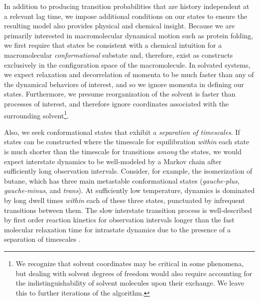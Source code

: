 In addition to producing transition probabilities that are history independent at a relevant lag time, we impose additional conditions on our states to ensure the resulting model also provides physical and chemical insight.
Because we are primarily interested in macromolecular dynamical motion such as protein folding, we first require that states be consistent with a chemical intuition for a macromolecular {\em conformational} substate and, therefore, exist as constructs exclusively in the configuration space of the macromolecule.
In solvated systems, we expect relaxation and decorrelation of momenta to be much faster than any of the dynamical behaviors of interest, and so we ignore momenta in defining our states.  
Furthermore, we presume reorganization of the solvent is faster than processes of interest, and therefore ignore coordinates associated with the surrounding solvent\footnote{We recognize that solvent coordinates may be critical in some phenomena, but dealing with solvent degrees of freedom would also require accounting for the indistinguishability of solvent molecules upon their exchange.  We leave this to further iterations of the algorithm.}.

Also, we seek conformational states that exhibit a {\em separation of timescales}.
If states can be constructed where the timescale for equilibration \emph{within} each state is much shorter than the timescale for transitions \emph{among} the states, we would expect interstate dynamics to be well-modeled by a Markov chain after sufficiently long observation intervals.
Consider, for example, the isomerization of butane, which has three main metastable conformational states (\emph{gauche-plus}, \emph{gauche-minus}, and \emph{trans}).
At sufficiently low temperature, dynamics is dominated by long dwell times \emph{within} each of these three states, punctuated by infrequent transitions between them.  
The slow interstate transition process is well-described by first order reaction kinetics for observation intervals longer than the fast molecular relaxation time for intrastate dynamics due to the presence of a separation of timescales \cite{chandler:1978a}.

